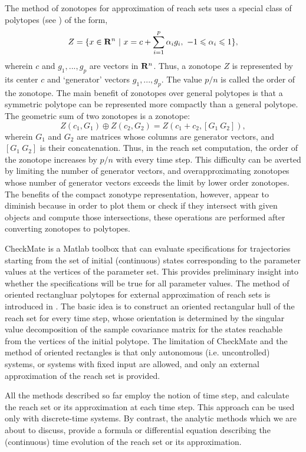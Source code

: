 \documentclass{report}
\begin{document}
The method of zonotopes for approximation of reach sets
\cite{girard, leguernic, matisse} uses a special class of polytopes
(see \cite{zonotool}) of the form,
\[ Z=\{x \in {\bf R}^n ~|~
x=c+\sum_{i=1}^p\alpha_ig_i,~ -1\leq\alpha_i\leq1\}, \]
wherein $c$ and $g_1, ..., g_p$ are vectors in ${\bf R}^n$. Thus, a
zonotope $Z$ is  represented by its center $c$ and `generator' vectors
$g_1, ..., g_p$. The value $p/n$ is called the order of the zonotope.
The main benefit of zonotopes over general polytopes is that a symmetric
polytope can be represented more compactly than a general polytope.
The geometric sum of two zonotopes is a zonotope:
\[ Z(c_1, G_1)\oplus Z(c_2, G_2) = Z(c_1+c_2, [G_1 ~ G_2]), \]
wherein $G_1$ and $G_2$ are matrices whose columns are generator vectors,
and $[G_1 ~ G_2]$ is their concatenation. Thus, in the reach set computation,
the order of the zonotope increases by $p/n$ with every time step.
This difficulty can be averted by limiting the number of generator vectors,
and overapproximating zonotopes whose number of generator vectors exceeds
the limit by lower order zonotopes.
The benefits of the compact zonotype representation, however, appear
to diminish because in order to plot them or check if they
intersect with given objects and compute those intersections,
these operations are performed after converting zonotopes to polytopes.

CheckMate \cite{checkmate} is a Matlab toolbox that can evaluate specifications
for trajectories starting from the set of initial (continuous) states
corresponding to the parameter values at the vertices of the parameter set.
This provides preliminary insight into whether the specifications will be true
for all parameter values.
The method of oriented rectangluar polytopes for external approximation
of reach sets is introduced in \cite{krogh}.
The basic idea is to construct an oriented
rectangular hull of the reach set for every time step, whose orientation is
determined by the singular value decomposition of the sample covariance matrix
for the states reachable from the vertices of the initial polytope.
The limitation of CheckMate and the method of oriented rectangles is
that only autonomous (i.e. uncontrolled) systems, or  systems with fixed
input are allowed, and only an external approximation of the reach set
is provided.

All the methods described so far employ the notion of time step,
and calculate the reach set or its approximation at each time step.
This approach can be used only with discrete-time systems.
By contrast, the analytic methods which we are about to discuss,
provide a formula or differential equation describing the (continuous)
time evolution of the reach set or its approximation.
\end{document}
